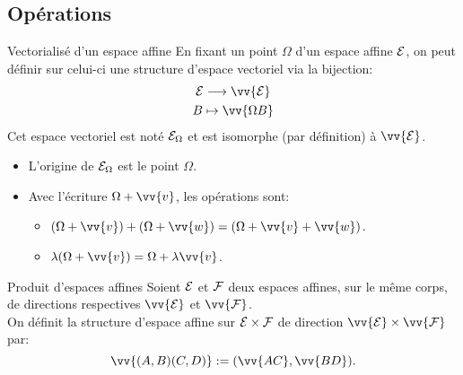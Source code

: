 \documentclass[
bigger]{m53beamer}
\begin{document}
\subsection{Opérations}
  \begin{frame}{Vectorialisé d'un espace affine}
    En fixant un point $\Omega$ d'un espace affine $\mathcal{E}$, on peut définir sur celui-ci une structure d'espace vectoriel via la bijection:
    \begin{gather*}
      \ens{E} \longrightarrow \vv{\ens{E}}\\
      B \mapsto \vv{\Omega B}
    \end{gather*}\pause
    Cet espace vectoriel est noté $\mathcal{E}_{\Omega}$ et est isomorphe (par définition) à $\vv{\ens{E}}$.
    \begin{itemize}[<+(1)->]
      \item L'origine de $\mathcal{E}_{\Omega}$ est le point $\Omega$.
      \item Avec l'écriture $\Omega+\vv{v}$, les opérations sont:
      \begin{itemize}[<+(1)->]
        \item $(\Omega+\vv{v})+(\Omega+\vv{w})=(\Omega+\vv{v}+\vv{w})$.
        \item $\lambda(\Omega+\vv{v})=\Omega+\lambda\vv{v}$.
      \end{itemize}
    \end{itemize}
  \end{frame}
  \begin{frame}{Produit d'espaces affines}
    Soient $\mathcal{E}$ et $\mathcal{F}$ deux espaces affines, sur le même corps, de directions respectives $\vv{\ens{E}}$ et $\vv{\ens{F}}$.\\
    On définit la structure d'espace affine  sur $\mathcal{E} \times \mathcal{F}$ de direction $\vv{\ens{E}} \times \vv{\ens{F}}$ par:
    $$
      \vv{(A,B)(C,D)}:=(\vv{AC},\vv{BD}).
    $$
  \end{frame}
\end{document}
